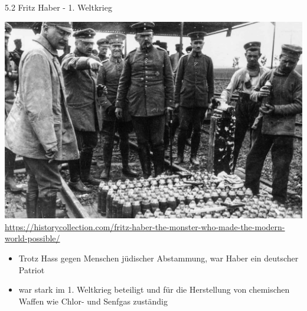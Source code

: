 \documentclass[
    aspectratio=1610
    ]{beamer}
\begin{document}
    \begin{frame}{5.2 Fritz Haber - 1. Weltkrieg}
        \begin{minipage}{6cm}
            \includegraphics[scale=.09]{figures/HaberChlorine.jpg}
            \tiny\color{gray}\url{https://historycollection.com/fritz-haber-the-monster-who-made-the-modern-world-possible/}
        \end{minipage}
        \begin{minipage}{7.75cm}
            \begin{itemize}
                \item Trotz Hass gegen Menschen jüdischer Abstammung, war Haber ein deutscher Patriot
                \item war stark im 1. Weltkrieg beteiligt und für die Herstellung von chemischen Waffen wie Chlor- und Senfgas zuständig
            \end{itemize}
        \end{minipage}
    \end{frame}
    
\end{document}
